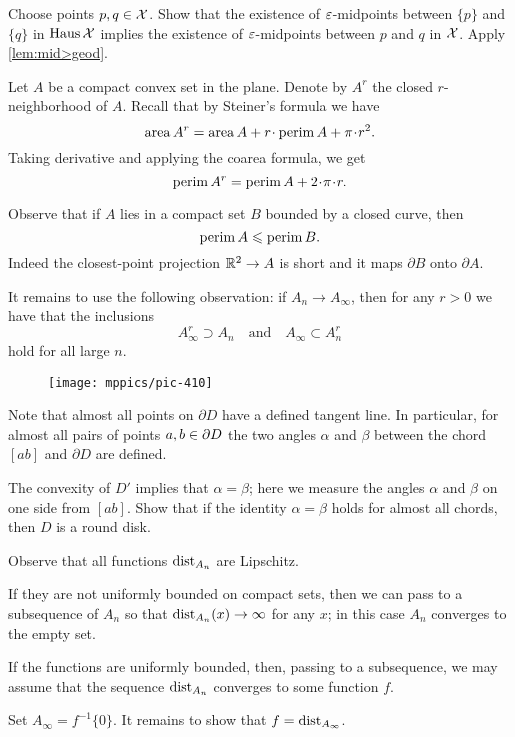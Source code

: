 Choose points $p,q\in\mathcal{X}$. 
Show that the existence of $\varepsilon$-midpoints between $\{p\}$ and $\{q\}$ in $\operatorname{\rm Haus}\nolimits\mathcal{X}$ implies the existence of $\varepsilon$-midpoints between $p$ and $q$ in $\mathcal{X}$.
Apply \ref{lem:mid>geod}.


Let $A$ be a compact convex set in the plane.
Denote by $A^r$ the closed $r$-neighborhood of $A$.
Recall that by Steiner's formula we have
\[\area A^r=\area A+r\cdot\perim A+\pi\cdot r^2.\]
Taking derivative and applying the coarea formula, we get 
\[\perim A^r=\perim A+2\cdot\pi\cdot r.\]

Observe that if $A$ lies in a compact set $B$ bounded by a closed curve, then 
\[\operatorname{\rm perim}\nolimits A\leqslant \operatorname{\rm perim}\nolimits B.\]
Indeed the closest-point projection $\mathbb{R}^2\to A$ is short and it maps $\partial B$ onto $\partial A$.

It remains to use the following observation: if $A_n\to A_\infty$, then for any $r>0$ we have that the inclusions
\[A_\infty^r\supset A_n
\quad\text{and}\quad
A_\infty\subset A_n^r\]
hold for all large $n$.

\begin{wrapfigure}{r}{27 mm}
\vskip-0mm
\centering
\texttt{[image: mppics/pic-410]}
\end{wrapfigure}

Note that almost all points on $\partial D$ have a defined tangent line.
In particular, for almost all pairs of points $a,b\z\in\partial D$ the two angles $\alpha$ and $\beta$ between the chord $[ab]$ and $ \partial D$ are defined.

The convexity of $D'$ implies that $\alpha=\beta$;
here we measure the angles $\alpha$ and $\beta$ on one side from $[ab]$.
Show that if the identity $\alpha=\beta$ holds for almost all chords, then $D$ is a round disk. 


Observe that all functions $\mathrm{dist}_{A_n}$ are Lipschitz.

If they are not uniformly bounded on compact sets, then we can pass to a subsequence of $A_n$ so that $\mathrm{dist}_{A_n}(x)\to\infty$ for any $x$;
in this case $A_n$ converges to the empty set.

If the functions are uniformly bounded, then, passing to a subsequence, we may assume that the sequence $\mathrm{dist}_{A_n}$ converges to some function $f$.

Set $A_\infty=f^{-1}\{0\}$.
It remains to show that $f=\mathrm{dist}_{A_\infty}$.

